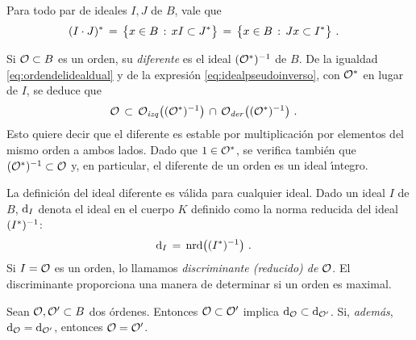 \begin{obsDualDeUnProducto}\label{obs:dualdeunproducto}
	Para todo par de ideales $I,J$ de $B$, vale que
	\begin{align*}
		\dual{(I\cdot J)} & \,=\,
			\big\{x\in B\,:\,xI\subset\dual{J}\big\}\,=\,
			\big\{x\in B\,:\,Jx\subset\dual{I}\big\}
		\text{ .}
	\end{align*}
\end{obsDualDeUnProducto}

Si $\cal{O}\subset B$ es un orden, su \emph{diferente} es el ideal
$(\dual{\cal{O}})^{-1}$ de $B$. De la igualdad \eqref{eq:ordendelidealdual} y
de la expresi\'{o}n \eqref{eq:idealpseudoinverso}, con $\dual{\cal{O}}$ en
lugar de $I$, se deduce que
\begin{align*}
	\cal{O} & \,\subset\,\Oizq\big((\dual{\cal{O}})^{-1}\big)\,\cap\,
		\Oder\big((\dual{\cal{O}})^{-1}\big)
	\text{ .}
\end{align*}
%
Esto quiere decir que el diferente es estable por multiplicaci\'{o}n por
elementos del mismo orden a ambos lados. Dado que $1\in\dual{\cal{O}}$, se
verifica tambi\'{e}n que $(\dual{\cal{O}})^{-1}\subset\cal{O}$ y, en
particular, el diferente de un orden es un ideal \'{\i}ntegro.

La definici\'{o}n del ideal diferente es v\'{a}lida para cualquier ideal. Dado
un ideal $I$ de $B$, $\drd{I}$ denota el ideal en el cuerpo $K$ definido como
la norma reducida del ideal $(\dual{I})^{-1}$:
\begin{align*}
	\drd{I} & \,=\,\nrd\big((\dual{I})^{-1}\big)
	\text{ .}
\end{align*}
%
Si $I=\cal{O}$ es un orden, lo llamamos \emph{discriminante (reducido) de %
$\cal{O}$}. El discriminante proporciona una manera de determinar si un orden
es maximal.

\begin{propoDiscriminante}\label{propo:discriminante}
	Sean $\cal{O},\cal{O}'\subset B$ dos \'{o}rdenes. Entonces
	$\cal{O}\subset\cal{O}'$ implica $\drd{\cal{O}}\subset\drd{\cal{O}'}$.
	Si, \emph{adem\'{a}s}, $\drd{\cal{O}}=\drd{\cal{O}'}$, entonces
	$\cal{O}=\cal{O}'$.
\end{propoDiscriminante}


